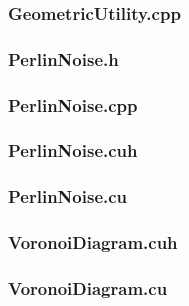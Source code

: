 \documentclass[a4paper, 10pt]{article}
\begin{document}
\subsubsection{GeometricUtility.cpp}

\newpage
\subsubsection{PerlinNoise.h}

\subsubsection{PerlinNoise.cpp}

\newpage
\subsubsection{PerlinNoise.cuh}

\subsubsection{PerlinNoise.cu}

\newpage
\subsubsection{VoronoiDiagram.cuh}

\subsubsection{VoronoiDiagram.cu}

\end{document}
